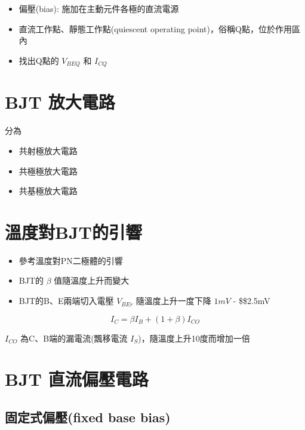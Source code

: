 \documentclass[
]{report}
\providecommand{\tightlist}{%
  \setlength{\itemsep}{0pt}\setlength{\parskip}{0pt}}
\begin{document}
\begin{itemize}
\tightlist
\item
  偏壓(bias): 施加在主動元件各極的直流電源
\item
  直流工作點、靜態工作點(quiescent operating
  point)，俗稱Q點，位於作用區內
\item
  找出Q點的 \(V_{BEQ}\) 和 \(I_{CQ}\)
\end{itemize}

\hypertarget{bjt-ux653eux5927ux96fbux8def}{%
\section{BJT 放大電路}\label{bjt-ux653eux5927ux96fbux8def}}

分為

\begin{itemize}
\tightlist
\item
  共射極放大電路
\item
  共極極放大電路
\item
  共基極放大電路
\end{itemize}

\hypertarget{ux6eabux5ea6ux5c0dbjtux7684ux5f15ux97ff}{%
\section{溫度對BJT的引響}\label{ux6eabux5ea6ux5c0dbjtux7684ux5f15ux97ff}}

\begin{itemize}
\tightlist
\item
  參考溫度對PN二極體的引響
\item
  BJT的 \(\beta\) 值隨溫度上升而變大
\item
  BJT的B、E兩端切入電壓 \(V_{BEr}\) 隨溫度上升一度下降 \(1mV\) -
  \$\$2.5mV
\end{itemize}

\[
I_C = \beta I_B + (1 + \beta) I_{CO}
\]

\(I_{CO}\) 為C、B端的漏電流(飄移電流 \(I_S\))，隨溫度上升10度而增加一倍

\hypertarget{bjt-ux76f4ux6d41ux504fux58d3ux96fbux8def}{%
\section{BJT
直流偏壓電路}\label{bjt-ux76f4ux6d41ux504fux58d3ux96fbux8def}}

\hypertarget{ux56faux5b9aux5f0fux504fux58d3fixed-base-bias}{%
\subsection{固定式偏壓(fixed base
bias)}\label{ux56faux5b9aux5f0fux504fux58d3fixed-base-bias}}
\end{document}
